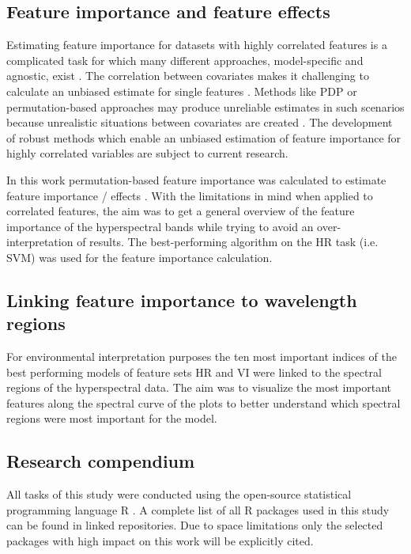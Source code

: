 \documentclass[journal]{IEEEtran}
\begin{document}
\subsection{Feature importance and feature effects}

Estimating feature importance for datasets with highly correlated features is a complicated task for which many different approaches, model-specific and agnostic, exist \cite{friedman2001, hastie2001, greenwell2018}.
The correlation between covariates makes it challenging to calculate an unbiased estimate for single features \cite{molnar2019}.
Methods like \ac{PDP} or permutation-based approaches may produce unreliable estimates in such scenarios because unrealistic situations between covariates are created \cite{molnar2019}.
The development of robust methods which enable an unbiased estimation of feature importance for highly correlated variables are subject to current research.

In this work permutation-based feature importance was calculated to estimate feature importance / effects \cite{apley2019}.
With the limitations in mind when applied to correlated features, the aim was to get a general overview of the feature importance of the hyperspectral bands while trying to avoid an over-interpretation of results.
The best-performing algorithm on the HR task (i.e. SVM) was used for the feature importance calculation.

\subsection{Linking feature importance to wavelength regions}

For environmental interpretation purposes the ten most important indices of the best performing models of feature sets HR and VI were linked to the spectral regions of the hyperspectral data.
The aim was to visualize the most important features along the spectral curve of the plots to better understand which spectral regions were most important for the model.

\subsection{Research compendium}

All tasks of this study were conducted using the open-source statistical programming language R \cite{rcoreteam2019}.
A complete list of all R packages used in this study can be found in linked repositories.
Due to space limitations only the selected packages with high impact on this work will be explicitly cited.
\end{document}
